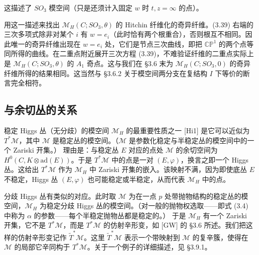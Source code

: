 这描述了 $SO_3$ 模空间（只是还须计入固定 $w$ 时 $t,z=\infty$ 的点）。

用这一描述来找出 $\mathcal{M}_H(C;SO_3,\theta)$ 的 Hitchin 纤维化的奇异纤维。(3.39) 右端的三次多项式除非对某个 $i$ 有 $w=e_i$（此时恰有两个根重合），否则根互不相同。因此唯一的奇异纤维出现在 $w=e_i$ 处，它们是节点三次曲线，即把 $\mathbb{C}\mathbb{P}^1$ 的两个点等同所得的曲线。在二重点附近展开三次方程 (3.39)，不难验证纤维的二重点实际上是 $\mathcal{M}_H(C;SO_3,\theta)$ 的 $A_1$ 奇点。这与我们在 §3.6 末为 $\mathcal{M}_H(C;SO_3,0)$ 的奇异纤维所得的结果相同。这当然与 §3.6.2 关于模空间两分支在复结构 $I$ 下等价的断言完全相符。

\subsection{与余切丛的关系}

稳定 Higgs 丛（无分歧）的模空间 $\mathcal{M}_H$ 的最重要性质之一 [Hi1] 是它可以近似为 $T^*\mathcal{M}$，其中 $\mathcal{M}$ 是稳定丛的模空间。（$\mathcal{M}$ 是参数化稳定与半稳定丛的模空间中的一个 Zariski 开集。）
理由是：与稳定丛 $E$ 对应的点处 $\mathcal{M}$ 的余切空间为 $H^0(C,K\otimes\mathrm{ad}(E))$。于是 $T^*\mathcal{M}$ 中的点是一对 $(E,\varphi)$，换言之即一个 Higgs 丛。这给出 $T^*\mathcal{M}$ 作为 $\mathcal{M}_H$ 中 Zariski 开集的嵌入。该映射不满，因为即使底丛 $E$ 不稳定，Higgs 丛 $(E,\varphi)$ 也可能稳定或半稳定，从而代表 $\mathcal{M}_H$ 中的点。

分歧 Higgs 丛有类似的对应。此时取 $\mathcal{M}$ 为在一点 $p$ 处带抛物结构的稳定丛的模空间，$\mathcal{M}_H$ 为稳定分歧 Higgs 丛的模空间。（对一般的抛物权选取——即式 (3.4) 中称为 $\alpha$ 的参数——每个半稳定抛物丛都是稳定的。）
于是 $\mathcal{M}_H$ 有一个 Zariski 开集，它不是 $T^*\mathcal{M}$，而是 $T^*\mathcal{M}$ 的仿射辛形变，如 [GW] 的 §3.6 所述。我们把这样的仿射辛形变记作 $\tilde{T}^*\mathcal{M}$。这里 $\tilde{T}^*\mathcal{M}$ 表示一个带映射到 $\mathcal{M}$ 的复辛簇，使得在 $\mathcal{M}$ 的局部它辛同构于 $T^*\mathcal{M}$。关于一个例子的详细描述，见 §3.9.1。

